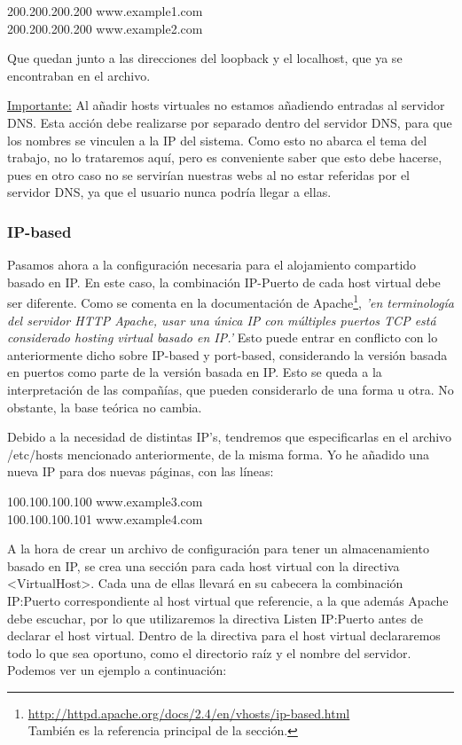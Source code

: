\documentclass[a4paper, 10pt]{article} %
\begin{document}
200.200.200.200 www.example1.com\\
200.200.200.200 www.example2.com

Que quedan junto a las direcciones del loopback y el localhost, que ya se encontraban en el archivo. 

\underline{Importante:} Al añadir hosts virtuales no estamos añadiendo entradas al servidor DNS. Esta acción debe realizarse por separado dentro del servidor DNS, para que los nombres se vinculen a la IP del sistema. Como esto no abarca el tema del trabajo, no lo trataremos aquí, pero es conveniente saber que esto debe hacerse, pues en otro caso no se servirían nuestras webs al no estar referidas por el servidor DNS, ya que el usuario nunca podría llegar a ellas. 

\subsubsection{IP-based}

Pasamos ahora a la configuración necesaria para el alojamiento compartido basado en IP. En este caso, la combinación IP-Puerto de cada host virtual debe ser diferente. Como se comenta en la documentación de Apache\footnote{\url{http://httpd.apache.org/docs/2.4/en/vhosts/ip-based.html}\\También es la referencia principal de la sección.}, \textit{'en terminología del servidor HTTP Apache, usar una única IP con múltiples puertos TCP está considerado hosting virtual basado en IP.'} Esto puede entrar en conflicto con lo anteriormente dicho sobre IP-based y port-based, considerando la versión basada en puertos como parte de la versión basada en IP. Esto se queda a la interpretación de las compañías, que pueden considerarlo de una forma u otra. No obstante, la base teórica no cambia. 

Debido a la necesidad de distintas IP's, tendremos que especificarlas en el archivo /etc/hosts mencionado anteriormente, de la misma forma. Yo he añadido una nueva IP para dos nuevas páginas, con las líneas:

100.100.100.100 www.example3.com \\
100.100.100.101 www.example4.com

A la hora de crear un archivo de configuración para tener un almacenamiento basado en IP, se crea una sección para cada host virtual con la directiva <VirtualHost>. Cada una de ellas llevará en su cabecera la combinación IP:Puerto correspondiente al host virtual que referencie, a la que además Apache debe escuchar, por lo que utilizaremos la directiva Listen IP:Puerto antes de declarar el host virtual. Dentro de la directiva para el host virtual declararemos todo lo que sea oportuno, como el directorio raíz y el nombre del servidor. Podemos ver un ejemplo a continuación: 
\end{document}
